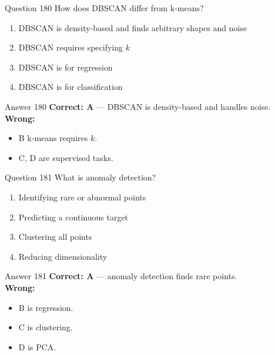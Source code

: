 \documentclass[aspectratio=169,11pt]{beamer}
\begin{document}
	\begin{frame}{Question 180}
		How does DBSCAN differ from k-means?
		\begin{enumerate}[label=\Alph*.]
			\item DBSCAN is density-based and finds arbitrary shapes and noise
			\item DBSCAN requires specifying $k$
			\item DBSCAN is for regression
			\item DBSCAN is for classification
		\end{enumerate}
	\end{frame}
	\begin{frame}{Answer 180}
		\textbf{Correct: A} --- DBSCAN is density-based and handles noise.\\
		\vspace{0.5em}
		\textbf{Wrong:}
		\begin{itemize}
			\item B k-means requires $k$.
			\item C, D are supervised tasks.
		\end{itemize}
	\end{frame}
	
	\begin{frame}{Question 181}
		What is anomaly detection?
		\begin{enumerate}[label=\Alph*.]
			\item Identifying rare or abnormal points
			\item Predicting a continuous target
			\item Clustering all points
			\item Reducing dimensionality
		\end{enumerate}
	\end{frame}
	\begin{frame}{Answer 181}
		\textbf{Correct: A} --- anomaly detection finds rare points.\\
		\vspace{0.5em}
		\textbf{Wrong:}
		\begin{itemize}
			\item B is regression.
			\item C is clustering.
			\item D is PCA.
		\end{itemize}
	\end{frame}
	
\end{document}
